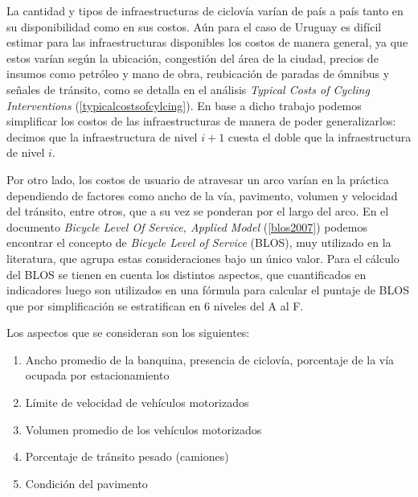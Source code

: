 \documentclass{article}
\begin{document}
  La cantidad y tipos de infraestructuras de ciclovía varían de país a país tanto en su disponibilidad como en sus costos. Aún para el caso de Uruguay es difícil estimar para las infraestructuras disponibles los costos de manera general, ya que estos varían según la ubicación, congestión del área de la ciudad, precios de insumos como petróleo y mano de obra, reubicación de paradas de ómnibus y señales de tránsito, como se detalla en el análisis {\it Typical Costs of Cycling Interventions} (\ref{typicalcostsofcylcing}). En base a dicho trabajo podemos simplificar los costos de las infraestructuras de manera de poder generalizarlos: decimos que la infraestructura de nivel $i+1$ cuesta el doble que la infraestructura de nivel $i$.

  Por otro lado, los costos de usuario de atravesar un arco varían en la práctica dependiendo de factores como ancho de la vía, pavimento, volumen y velocidad del tránsito, entre otros, que a su vez se ponderan por el largo del arco. En el documento {\it Bicycle Level Of Service, Applied Model} (\ref{blos2007}) podemos encontrar el concepto de {\it Bicycle Level of Service} (BLOS), muy utilizado en la literatura, que agrupa estas consideraciones bajo un único valor. Para el cálculo del BLOS se tienen en cuenta los distintos aspectos, que cuantificados en indicadores luego son utilizados en una fórmula para calcular el puntaje de BLOS que por simplificación se estratifican en 6 niveles del A al F.

  Los aspectos que se consideran son los siguientes:

  \begin{enumerate}
    \item{Ancho promedio de la banquina, presencia de ciclovía, porcentaje de la vía ocupada por estacionamiento}
    \item{Límite de velocidad de vehículos motorizados}
    \item{Volumen promedio de los vehículos motorizados}
    \item{Porcentaje de tránsito pesado (camiones)}
    \item{Condición del pavimento}
  \end{enumerate}
\end{document}
